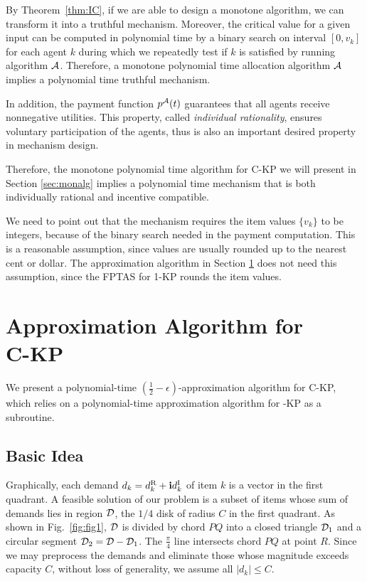 \documentclass{aamas2013}
\begin{document}
By Theorem~\ref{thm:IC}, if we are able to design a monotone algorithm, we can transform it into a truthful mechanism.  Moreover, the critical value for a given input can be computed in polynomial time by a binary search on interval $[0, v_k]$ for each agent $k$ during which we repeatedly test if $k$ is satisfied by running algorithm ${\cal A}$. Therefore, a monotone polynomial time allocation algorithm ${\cal A}$ implies a polynomial time truthful mechanism.

In addition, the payment function $p^{\cal A}(t)$ guarantees that all agents receive nonnegative utilities.  This property, called {\em individual rationality}, ensures voluntary participation of the agents, thus is also an important desired property in mechanism design.   
 
Therefore, the monotone polynomial time algorithm for C-KP we will present in Section \ref{sec:monalg} implies a polynomial time mechanism that is both individually rational and incentive compatible.  

We need to point out that the mechanism requires the item values $\{v_k\}$ to be integers, because of the binary search needed in the payment computation.  This is a reasonable assumption, since values are usually rounded up to the nearest cent or dollar.  The approximation algorithm in Section \ref{sec:algCKP} does not need this assumption, since the FPTAS for 1-KP rounds the item values.   


\section{Approximation Algorithm for \\C-KP}\label{sec:algCKP}
\noindent
We present a polynomial-time $(\frac{1}{2}-\epsilon)$-approximation algorithm for {\sc C-KP}, which relies on a polynomial-time approximation algorithm for {-KP} as a subroutine.   
\subsection{Basic Idea} \label{subsec:pic}
\noindent
Graphically, each demand $d_k=d^{\rm R}_k+ {\bf i}d^{\rm I}_k$ of item $k$ is a vector in the first quadrant.  A feasible solution of our problem is a subset of items whose sum of demands lies in region ${\cal D}$, the $1/4$ disk of radius $C$ in the first quadrant. 
As shown in Fig.~\ref{fig:fig1}, ${\cal D}$ is divided by chord $PQ$ into a closed triangle ${\cal D}_1$ and a circular segment ${\cal D}_2={\cal D}-{\cal D}_1$.  The $\frac{\pi}{4}$ line intersects chord $PQ$ at point $R$.  Since we may preprocess the demands and eliminate those whose magnitude exceeds capacity $C$, without loss of generality, we assume all $|d_k|\leq C$.  
\end{document}
